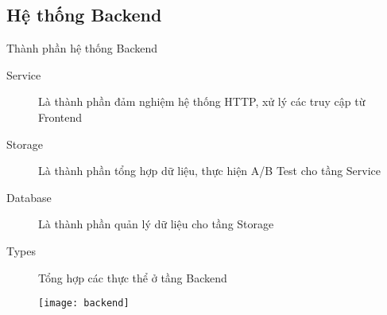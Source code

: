 \subsection{Hệ thống Backend}

\begin{frame}{Thành phần hệ thống Backend}
	\begin{description}
		\item[Service] Là thành phần đảm nghiệm hệ thống HTTP, xử lý các truy cập từ Frontend
		\item[Storage] Là thành phần tổng hợp dữ liệu, thực hiện A/B Test cho tầng Service
		\item[Database] Là thành phần quản lý dữ liệu cho tầng Storage
		\item[Types] Tổng hợp các thực thể ở tầng Backend
	\end{description}
	\begin{figure}
		\texttt{[image: backend]}
	\end{figure}
\end{frame}


